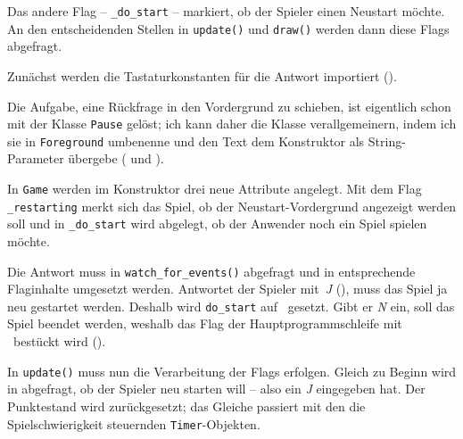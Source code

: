Das andere Flag -- \texttt{\_do\_start} -- markiert, ob der Spieler einen Neustart möchte. An den entscheidenden Stellen in \texttt{update()} und \texttt{draw()} werden dann diese Flags abgefragt.

Zunächst werden die Tastaturkonstanten für die Antwort importiert ().


Die Aufgabe, eine Rückfrage in den Vordergrund zu schieben, ist eigentlich schon mit der Klasse \texttt{Pause} gelöst; ich kann daher die Klasse verallgemeinern, indem ich sie in \texttt{Foreground} umbenenne und den Text dem Konstruktor als String-Parameter übergebe ( und ).



In \texttt{Game} werden im Konstruktor drei neue Attribute angelegt. Mit dem Flag \texttt{\_restarting} merkt sich das Spiel, ob der Neustart-Vordergrund angezeigt werden soll und in \texttt{\_do\_start} wird abgelegt, ob der Anwender noch ein Spiel spielen möchte.


Die Antwort muss in \texttt{watch\_for\_events()} abgefragt und in entsprechende Flaginhalte umgesetzt werden. Antwortet der Spieler mit~\emph{J} (), muss das Spiel ja neu gestartet werden. Deshalb wird \texttt{do\_start} auf \true\ gesetzt. Gibt er \emph{N} ein, soll das Spiel beendet werden, weshalb das Flag der Hauptprogrammschleife mit \false\ bestückt wird ().


In \texttt{update()} muss nun die Verarbeitung der Flags erfolgen. Gleich zu Beginn wird in  abgefragt, ob der Spieler neu starten will -- also ein \emph{J} eingegeben hat. Der Punktestand wird zurückgesetzt; das Gleiche passiert mit den die Spielschwierigkeit steuernden \texttt{Timer}-Objekten. 

